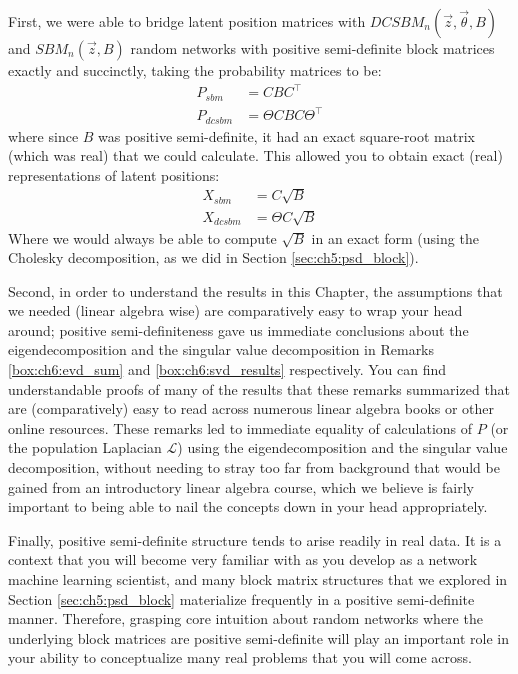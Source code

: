 First, we were able to bridge latent position matrices with $DCSBM_n(\vec z, \vec \theta, B)$ and $SBM_n(\vec z, B)$ random networks with positive semi-definite block matrices exactly and succinctly, taking the probability matrices to be:
\begin{align*}
    P_{sbm} &= C B C^\top \\
    P_{dcsbm} &= \Theta C B C\Theta^\top
\end{align*}
where since $B$ was positive semi-definite, it had an exact square-root matrix (which was real) that we could calculate. This allowed you to obtain exact (real) representations of latent positions:
\begin{align*}
    X_{sbm} &= C\sqrt{B} \\
    X_{dcsbm} &= \Theta C \sqrt{B}
\end{align*}
Where we would always be able to compute $\sqrt{B}$ in an exact form (using the Cholesky decomposition, as we did in Section \ref{sec:ch5:psd_block}). 

Second, in order to understand the results in this Chapter, the assumptions that we needed (linear algebra wise) are comparatively easy to wrap your head around; positive semi-definiteness gave us immediate conclusions about the eigendecomposition and the singular value decomposition in Remarks \ref{box:ch6:evd_sum} and \ref{box:ch6:svd_results} respectively. You can find understandable proofs of many of the results that these remarks summarized that are (comparatively) easy to read across numerous linear algebra books \cite{Axler, Trefethen1997} or other online resources. These remarks led to immediate equality of calculations of $P$ (or the population Laplacian $\mathcal L$) using the eigendecomposition and the singular value decomposition, without needing to stray too far from background that would be gained from an introductory linear algebra course, which we believe is fairly important to being able to nail the concepts down in your head appropriately. 

Finally, positive semi-definite structure tends to arise readily in real data. It is a context that you will become very familiar with as you develop as a network machine learning scientist, and many block matrix structures that we explored in Section \ref{sec:ch5:psd_block} materialize frequently in a positive semi-definite manner. Therefore, grasping core intuition about random networks where the underlying block matrices are positive semi-definite will play an important role in your ability to conceptualize many real problems that you will come across.

